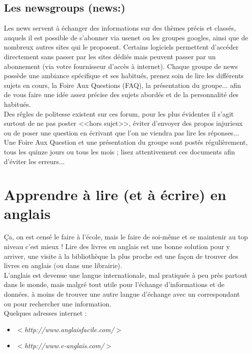 \documentclass[11pt,twoside,a4paper]{article}
\begin{document}
	\subsection{Les newsgroups (news:)}
			Les news servent {\`a} {\'e}changer des informations sur des th{\`e}mes pr{\'e}cis et class{\'e}s, auquels il est possible de s'abonner via usenet ou les groupes googles, ainsi que de nombreux autres sites qui le proposent. Certains logiciels permettent d'acc{\'e}der directement sans passer par les sites d{\'e}di{\'e}s mais peuvent passer par un abonnement (via votre fournisseur d'acc{\`e}s {\`a} internet). Chaque groupe de news poss{\`e}de une ambiance sp{\'e}cifique et ses habitu{\'e}s, prenez soin de lire les diff{\'e}rents sujets en cours, la Foire Aux Questions (FAQ), la pr{\'e}sentation du groupe... afin de vous faire une id{\'e}e assez pr{\'e}cise des sujets abord{\'e}s et de la personnalit{\'e} des habitu{\'e}s. ~\\

			Des r{\^e}gles de politesse existent sur ces forum, pour les plus {\'e}videntes il s'agit surtout de ne pas poster <<hors sujet>>, {\'e}viter d'envoyer des propos injurieux ou de poser une question en {\'e}crivant que l'on ne viendra pas lire les r{\'e}ponses... Une Foire Aux Question et une pr{\'e}sentation du groupe sont post{\'e}s r{\'e}guli{\`e}rement, tous les quinze jours ou tous les mois ; lisez attentivement ces documents afin d'{\'e}viter les erreurs...~\\


\section{Apprendre {\`a} lire (et {\`a} {\'e}crire) en anglais}
		\c{C}a, on est cens{\'e} le faire {\`a} l'{\'e}cole, mais le faire de soi-m{\^e}me et se maintenir au top niveau c'est mieux ! Lire des livres en anglais est une bonne solution pour y arriver, une visite {\`a} la biblioth{\`e}que la plus proche est une fa\c{c}on de trouver des livres en anglais (ou dans une librairie). ~\\

	L'anglais est devenue une langue internationale, mal pratiqu{\'e}e {\`a} peu pr{\`e}s partout dans le monde, mais malgr{\'e} tout utile pour l'{\'e}change d'informations et de donn{\'e}es. {\`a} moins de trouver une autre langue d'{\'e}change avec un correspondant ou pour rechercher une information. ~\\

	Quelques adresses internet : 
	\begin{itemize}
		\item $<$\emph{http://www.anglaisfacile.com/}$>$
		\item $<$\emph{http://www.e-anglais.com/}$>$
	\end{itemize}~\\
\end{document}
